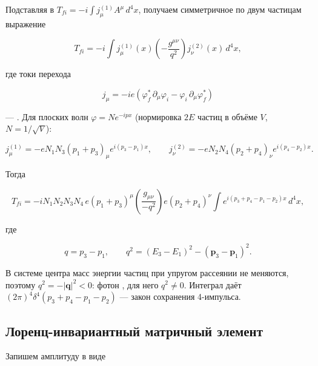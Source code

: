 \documentclass[../final.tex]{subfiles}
\begin{document}
Подставляя в $T_{fi}=-i\int j^{(1)}_\mu A^\mu\,d^4x$, получаем
симметричное по двум частицам выражение

\begin{equation*}
    T_{fi}
    =
    -i\int
    j^{(1)}_\mu(x)
    \left(-\frac{g^{\mu\nu}}{q^2}\right)
    j^{(2)}_\nu(x)\,
    d^4x,
\end{equation*}

где токи перехода

\begin{equation*}
    j_\mu
    =
    -ie
    \left(
        \varphi_f^*\,\partial_\mu\varphi_i
        -
        \varphi_i\,\partial_\mu\varphi_f^*
    \right)
\end{equation*}

--- . Для плоских волн
$\varphi=Ne^{-ipx}$ (нормировка $2E$ частиц в объёме $V$,
$N=1/\sqrt V$):

\begin{equation*}
    j^{(1)}_\mu
    =
    -eN_1N_3\left(p_1+p_3\right)_\mu e^{i(p_3-p_1)x},
    \qquad
    j^{(2)}_\nu
    =
    -eN_2N_4\left(p_2+p_4\right)_\nu e^{i(p_4-p_2)x}.
\end{equation*}

Тогда

\begin{equation*}
    T_{fi}
    =
    -iN_1N_2N_3N_4\,
    e\left(p_1+p_3\right)^\mu
    \left(\frac{g_{\mu\nu}}{-q^2}\right)
    e\left(p_2+p_4\right)^\nu
    \int e^{i(p_3+p_4-p_1-p_2)x}\,d^4x,
\end{equation*}

где

\begin{equation*}
    q=p_3-p_1,
    \qquad
    q^2
    =
    \left(E_3-E_1\right)^2-\left(\mathbf p_3-\mathbf p_1\right)^2.
\end{equation*}

В системе центра масс энергии частиц при упругом рассеянии
не меняются, поэтому $q^2=-|\mathbf q|^2<0$:
фотон , для него $q^2\neq0$.
Интеграл даёт $(2\pi)^4\delta^4(p_3+p_4-p_1-p_2)$ ---
закон сохранения 4-импульса.


\subsection{Лоренц-инвариантный матричный элемент}

Запишем амплитуду в виде
\end{document}

